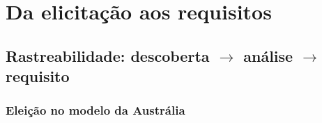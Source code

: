 \documentclass[12pt,a4paper]{article}
\newcounter{epico}
\begin{document}
\clearpage
\section{Da elicita\c{c}\~ao aos requisitos}

\subsection{Rastreabilidade: descoberta $\rightarrow$ an\'alise $\rightarrow$ requisito}


\subsubsection{Eleição no modelo da Austrália}
\end{document}
